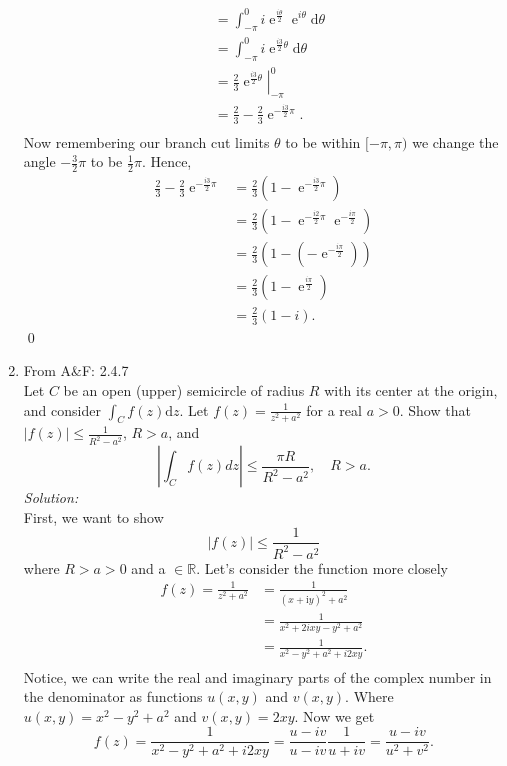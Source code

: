 \documentclass[10pt]{amsart}
\newcommand{\D}{\mathrm{d}}
\newcommand{\I}{\mathrm{i}}
\DeclareMathOperator{\E}{e}
\theoremstyle{nonumberplain}
\begin{document}
\begin{enumerate}[label={\bf {\arabic*}:}]
\begin{align*}
	&= \int_{-\pi}^{0} i\E^{\frac{i\theta}{2}} \E^{i\theta} \D \theta \\
	&= \int_{-\pi}^{0} i\E^{\frac{i3}{2}\theta} \D \theta \\
	&= \left. \frac 2 3 \E^{\frac{i3}{2}\theta} \right|_{-\pi}^{0} \\
	&= \frac 2 3 - \frac 2 3 \E^{ - \frac{i3}{2} \pi}. \\
\end{align*}
Now remembering our branch cut limits $\theta$ to be within $[-\pi, \pi)$ we change the angle $-\frac 3 2 \pi$ to be $\frac 1 2 \pi$.
Hence,
\begin{align*}
\frac 2 3 - \frac 2 3 \E^{ - \frac{i3}{2} \pi}
	&= \frac 2 3 \left( 1 - \E^{ - \frac{i3}{2} \pi} \right) \\
	&= \frac 2 3 \left( 1 - \E^{ - \frac{i2}{2} \pi} \E^{ - \frac{i\pi}{2}} \right) \\
	&= \frac 2 3 \left( 1 - \left(-\E^{ - \frac{i\pi}{2}} \right) \right) \\
	&= \frac 2 3 \left( 1 - \E^{\frac{i\pi}{2}} \right) \\
	&= \frac 2 3 \left( 1 - i \right).
\end{align*}
\qed
\\
\item From A\&F: 2.4.7 \\
Let $C$ be an open (upper) semicircle of radius $R$ with its center at the origin, and consider $\int_C f(z) \D z$.
 Let $f(z) = \frac{1}{z^2 + a^2}$ for a real $a > 0$.
Show that $\left| f(z) \right| \leq \frac{1}{R^2 - a^2}$, $R > a$, and
$$
\left| \int_C f(z) dz \right| \leq \frac{\pi R}{R^2 - a^2}, \quad R > a.
$$
\textit{Solution:} \\
First, we want to show
$$
\left| f(z) \right| \leq \frac{1}{R^2 - a^2}
$$
where $R > a > 0$ and a $\in \mathbb R$.
Let's consider the function more closely
\begin{align*}
f(z) =  \frac{1}{z^2 + a^2} &= \frac{1}{(x + \I y)^2 + a^2} \\
	&= \frac{1}{x^2 + 2ixy - y^2 + a^2} \\
	&= \frac{1}{x^2 - y^2 + a^2 + i2xy }. \\
\end{align*}
Notice, we can write the real and imaginary parts of the complex number in the denominator as functions $u(x, y)$ and $v(x, y)$.
Where $u(x, y) = x^2 - y^2 + a^2$ and $v(x, y) = 2xy$.
Now we get 
$$
f(z) = \frac{1}{x^2 - y^2 + a^2 + i2xy }	 = \frac{u - iv }{u - iv }\frac{1}{u + iv } = \frac{u - iv }{u^2 + v^2 }.
$$
\end{enumerate}
\end{document}
